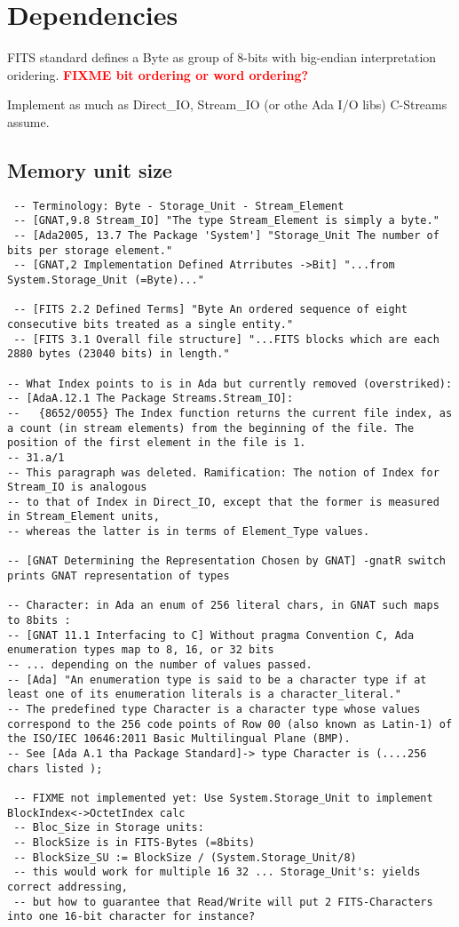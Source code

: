 \documentclass[a4paper,10pt]{article}
\newcommand{\fixme}[1]{\textbf{\textcolor{red}{FIXME #1}}}
\begin{document}
\section{Dependencies}

FITS standard defines a Byte as group of 8-bits with big-endian 
interpretation oridering. \fixme{bit ordering or word ordering?}

Implement as much as Direct\_IO, Stream\_IO (or othe Ada I/O libs) C-Streams assume.

\subsection{Memory unit size}

\begin{verbatim}
 -- Terminology: Byte - Storage_Unit - Stream_Element
 -- [GNAT,9.8 Stream_IO] "The type Stream_Element is simply a byte."
 -- [Ada2005, 13.7 The Package 'System'] "Storage_Unit The number of bits per storage element."
 -- [GNAT,2 Implementation Defined Atrributes ->Bit] "...from System.Storage_Unit (=Byte)..."

 -- [FITS 2.2 Defined Terms] "Byte An ordered sequence of eight consecutive bits treated as a single entity."
 -- [FITS 3.1 Overall file structure] "...FITS blocks which are each 2880 bytes (23040 bits) in length."

-- What Index points to is in Ada but currently removed (overstriked):
-- [AdaA.12.1 The Package Streams.Stream_IO]:
--   {8652/0055} The Index function returns the current file index, as a count (in stream elements) from the beginning of the file. The position of the first element in the file is 1.
-- 31.a/1
-- This paragraph was deleted. Ramification: The notion of Index for Stream_IO is analogous
-- to that of Index in Direct_IO, except that the former is measured in Stream_Element units,
-- whereas the latter is in terms of Element_Type values.

-- [GNAT Determining the Representation Chosen by GNAT] -gnatR switch prints GNAT representation of types

-- Character: in Ada an enum of 256 literal chars, in GNAT such maps to 8bits :
-- [GNAT 11.1 Interfacing to C] Without pragma Convention C, Ada enumeration types map to 8, 16, or 32 bits
-- ... depending on the number of values passed.
-- [Ada] "An enumeration type is said to be a character type if at least one of its enumeration literals is a character_literal."
-- The predefined type Character is a character type whose values correspond to the 256 code points of Row 00 (also known as Latin-1) of the ISO/IEC 10646:2011 Basic Multilingual Plane (BMP).
-- See [Ada A.1 tha Package Standard]-> type Character is (....256 chars listed );

 -- FIXME not implemented yet: Use System.Storage_Unit to implement BlockIndex<->OctetIndex calc
 -- Bloc_Size in Storage units:
 -- BlockSize is in FITS-Bytes (=8bits)
 -- BlockSize_SU := BlockSize / (System.Storage_Unit/8)
 -- this would work for multiple 16 32 ... Storage_Unit's: yields correct addressing,
 -- but how to guarantee that Read/Write will put 2 FITS-Characters into one 16-bit character for instance?
\end{verbatim}
\end{document}
